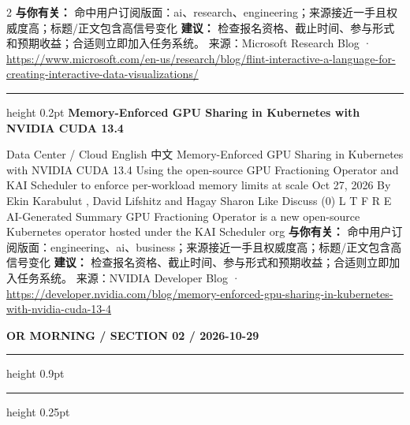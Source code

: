 \documentclass[10.5pt]{ctexart}
\begin{document}
\begin{multicols}{2}
\textbf{与你有关：} 命中用户订阅版面：ai、research、engineering；来源接近一手且权威度高；标题/正文包含高信号变化
\textbf{建议：} 检查报名资格、截止时间、参与形式和预期收益；合适则立即加入任务系统。
{\footnotesize\color{ormuted} 来源：Microsoft Research Blog · \url{https://www.microsoft.com/en-us/research/blog/flint-interactive-a-language-for-creating-interactive-data-visualizations/}}
\vspace{2mm}
\hrule height 0.2pt
\vspace{2mm}
{\large\bfseries Memory-Enforced GPU Sharing in Kubernetes with NVIDIA CUDA 13.4}\par
Data Center / Cloud English 中文 Memory-Enforced GPU Sharing in Kubernetes with NVIDIA CUDA 13.4 Using the open-source GPU Fractioning Operator and KAI Scheduler to enforce per-workload memory limits at scale Oct 27, 2026 By Ekin Karabulut , David Lifshitz and Hagay Sharon Like Discuss (0) L T F R E AI-Generated Summary GPU Fractioning Operator is a new open-source Kubernetes operator hosted under the KAI Scheduler org
\textbf{与你有关：} 命中用户订阅版面：engineering、ai、business；来源接近一手且权威度高；标题/正文包含高信号变化
\textbf{建议：} 检查报名资格、截止时间、参与形式和预期收益；合适则立即加入任务系统。
{\footnotesize\color{ormuted} 来源：NVIDIA Developer Blog · \url{https://developer.nvidia.com/blog/memory-enforced-gpu-sharing-in-kubernetes-with-nvidia-cuda-13-4}}
\end{multicols}
\newpage
{\small\bfseries OR MORNING / SECTION 02 / 2026-10-29}
\vspace{2mm}
\hrule height 0.9pt
\vspace{1.5mm}
\hrule height 0.25pt
\vspace{4mm}
\end{document}
